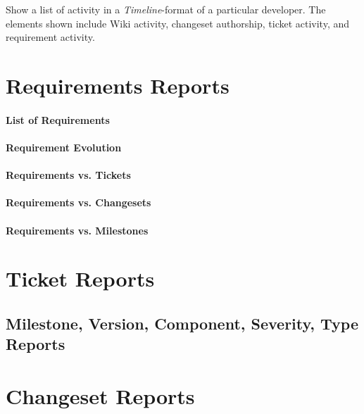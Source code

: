 \documentclass{article}
\begin{document}
Show a list of activity in a \textit{Timeline}-format of a particular developer.
The elements shown include Wiki activity, changeset authorship, ticket activity,
and requirement activity.


\section{Requirements Reports}

\paragraph{List of Requirements}


\paragraph{Requirement Evolution}


\paragraph{Requirements vs. Tickets}


\paragraph{Requirements vs. Changesets}


\paragraph{Requirements vs. Milestones}



\section{Ticket Reports}


\subsection{Milestone, Version, Component, Severity, Type Reports}



\section{Changeset Reports}
\end{document}
